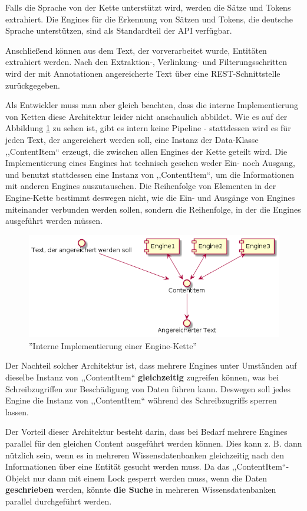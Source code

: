 Falls die Sprache von der Kette unterstützt wird, werden die Sätze und Tokens extrahiert. Die Engines für die Erkennung von Sätzen und Tokens, die deutsche Sprache unterstützen, sind als Standardteil der API verfügbar.

Anschließend können aus dem Text, der vorverarbeitet wurde, Entitäten extrahiert werden. Nach den Extraktion-, Verlinkung- und Filterungsschritten wird der mit Annotationen angereicherte Text über eine REST-Schnittstelle zurückgegeben.

Als Entwickler muss man aber gleich beachten, dass die interne Implementierung von Ketten diese Architektur leider nicht anschaulich abbildet. Wie es auf der Abbildung \ref{fig:REALPIPELINE} zu sehen ist, gibt es intern keine Pipeline - stattdessen wird es für jeden Text, der angereichert werden soll, eine Instanz der Data-Klasse ,,ContentItem`` erzeugt, die zwischen allen Engines der Kette geteilt wird. Die Implementierung eines Engines hat technisch gesehen weder Ein- noch Ausgang, und benutzt stattdessen eine Instanz von ,,ContentItem``, um die Informationen mit anderen Engines auszutauschen. Die Reihenfolge von Elementen in der Engine-Kette bestimmt deswegen nicht, wie die Ein- und Ausgänge von Engines miteinander verbunden werden sollen, sondern die Reihenfolge, in der die Engines ausgeführt werden müssen.

\begin{figure}[ht]
\centering
\includegraphics[width=\textwidth]{Bilder/realarch.png}
\caption{''Interne Implementierung einer Engine-Kette''}
\label{fig:REALPIPELINE}
\end{figure}
Der Nachteil solcher Architektur ist, dass mehrere Engines unter Umständen auf dieselbe Instanz von ,,ContentItem`` \textbf{gleichzeitig} zugreifen können, was bei Schreibzugriffen zur Beschädigung von Daten führen kann. Deswegen soll jedes Engine die Instanz von ,,ContentItem`` während des Schreibzugriffs sperren lassen.

Der Vorteil dieser Architektur besteht darin, dass bei Bedarf mehrere Engines parallel für den gleichen Content ausgeführt werden können. Dies kann z. B. dann nützlich sein, wenn es in mehreren Wissensdatenbanken gleichzeitig nach den Informationen über eine Entität gesucht werden muss. Da das ,,ContentItem``-Objekt nur dann mit einem Lock gesperrt werden muss, wenn die Daten \textbf{geschrieben} werden, könnte \textbf{die Suche} in mehreren Wissensdatenbanken parallel durchgeführt werden.

